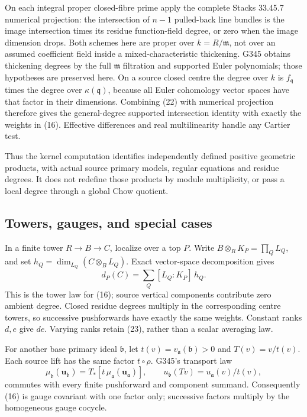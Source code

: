 \documentclass[11pt]{article}
\begin{document}
On each integral proper closed-fibre prime apply the complete
Stacks 33.45.7 numerical projection:
the intersection of \(n-1\) pulled-back line bundles is the
image intersection times its residue function-field degree,
or zero when the image dimension drops. Both schemes here
are proper over \(k=R/\mathfrak m\), not over an assumed
coefficient field inside a mixed-characteristic thickening.
G345 obtains thickening degrees by the full \(\mathfrak m\)
filtration and supported Euler polynomials; those hypotheses
are preserved here. On a source closed centre the degree over
\(k\) is \(f_{\mathfrak q}\) times the degree over
\(\kappa(\mathfrak q)\), because all Euler cohomology vector
spaces have that factor in their dimensions.
Combining (22) with numerical projection therefore gives
the general-degree supported intersection identity with
exactly the weights in (16).
Effective differences and real multilinearity handle any
Cartier test.

Thus the kernel computation identifies independently defined
positive geometric products, with actual source primary
models, regular equations and residue degrees. It does not
redefine those products by module multiplicity, or pass a
local degree through a global Chow quotient.

\subsection*{Towers, gauges, and special cases}
In a finite tower \(R\to B\to C\), localize over a top \(P\).
Write \(B\otimes_R K_P=\prod_Q L_Q\), and set
\(h_Q=\dim_{L_Q}(C\otimes_B L_Q)\). Exact vector-space
decomposition gives
\[
 d_P(C)=\sum_Q [L_Q:K_P]\,h_Q.                                \tag{23}
\]
This is the tower law for (16); source vertical components
contribute zero ambient degree. Closed residue degrees multiply
in the corresponding centre towers, so successive pushforwards
have exactly the same weights. Constant ranks \(d,e\) give \(de\).
Varying ranks retain (23), rather than a scalar averaging law.

For another base primary ideal \(\mathfrak b\), let
\(t(v)=v_{\mathfrak a}(\mathfrak b)>0\) and
\(T(v)=v/t(v)\). Each source lift has the same factor
\(t\circ\rho\). G345's transport law
\[
 \mu_{\mathfrak b}(\boldsymbol u_{\mathfrak b})
    =T_*[t\,\mu_{\mathfrak a}(\boldsymbol u_{\mathfrak a})],
 \qquad u_{\mathfrak b}(Tv)=u_{\mathfrak a}(v)/t(v),             \tag{24}
\]
commutes with every finite pushforward and component summand.
Consequently (16) is gauge covariant with one factor only;
successive factors multiply by the homogeneous gauge cocycle.
\end{document}
